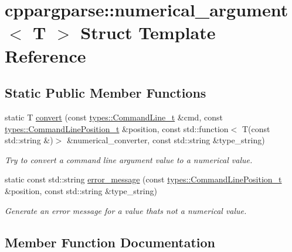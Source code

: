 \hypertarget{structcppargparse_1_1numerical__argument}{}\section{cppargparse\+:\+:numerical\+\_\+argument$<$ T $>$ Struct Template Reference}
\label{structcppargparse_1_1numerical__argument}
\subsection*{Static Public Member Functions}
\begin{DoxyCompactItemize}
\item 
static T \hyperlink{structcppargparse_1_1numerical__argument_ab775dbbfc851bbd9052b70dfdf0dbb77}{convert} (const \hyperlink{types_8h_a80adf2418b7ce9fe616698efa7533ecf}{types\+::\+Command\+Line\+\_\+t} \&cmd, const \hyperlink{types_8h_a43b4f43f8940de1bf09ced6f1b668053}{types\+::\+Command\+Line\+Position\+\_\+t} \&position, const std\+::function$<$ T(const std\+::string \&)$>$ \&numerical\+\_\+converter, const std\+::string \&type\+\_\+string)
\begin{DoxyCompactList}\small\item\em Try to convert a command line argument value to a numerical value. \end{DoxyCompactList}\item 
static const std\+::string \hyperlink{structcppargparse_1_1numerical__argument_a05ead3c772c43a02b6608ef2b2382fb8}{error\+\_\+message} (const \hyperlink{types_8h_a43b4f43f8940de1bf09ced6f1b668053}{types\+::\+Command\+Line\+Position\+\_\+t} \&position, const std\+::string \&type\+\_\+string)
\begin{DoxyCompactList}\small\item\em Generate an error message for a value that\textquotesingle{}s not a numerical value. \end{DoxyCompactList}\end{DoxyCompactItemize}


\subsection{Member Function Documentation}
\mbox{\label{structcppargparse_1_1numerical__argument_ab775dbbfc851bbd9052b70dfdf0dbb77}} 
